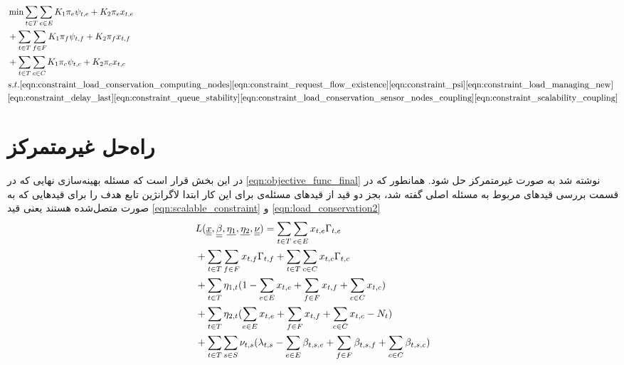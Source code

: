 	\begin{align}
		&\min \sum_{t \in T}\sum_{e \in E} 				K_1\pi_e\psi_{t,e}+K_2\pi_ex_{t,e}\notag \\
		&+\sum_{t \in T}\sum_{f \in F} 	K_1\pi_f\psi_{t,f}+K_2\pi_fx_{t,f}\notag \\
		&+\sum_{t \in T}\sum_{c \in C} K_1\pi_c\psi_{t,c}+K_2\pi_cx_{t,c} \label{eqn:objective_func_final} \notag \\
		&s.t. 
		\cref{eqn:constraint_load_conservation_computing_nodes}
		\cref{eqn:constraint_request_flow_existence}				\cref{eqn:constraint_psi}
		\cref{eqn:constraint_load_managing_new} \notag \\
		&\cref{eqn:constraint_delay_last}
		\cref{eqn:constraint_queue_stability}
		\cref{eqn:constraint_load_conservation_sensor_nodes_coupling}
		\cref{eqn:constraint_scalability_coupling}
	\end{align}
	
	\section{راه‌حل غیرمتمرکز}
	در این بخش قرار است که مسئله بهینه‌سازی نهایی که در \cref{eqn:objective_func_final} نوشته شد به صورت غیرمتمرکز حل شود. 
	همانطور که در قسمت بررسی قیدهای مربوط به مسئله اصلی گفته شد، بجز دو قید از قیدهای مسئله‌ی 
		 برای این کار ابتدا لاگرانژین تابع هدف را برای قیدهایی که به صورت متصل‌شده هستند یعنی قید \cref{eqn:scalable_constraint} و \cref{eqn:load_conservation2} 
	\begin{subequations}
		\begin{align}
		& \notag L(\underline{\underline x}, \underline{\underline \beta}, \underline {\eta_1}, \underline {\eta_2}, \underline{\underline \nu}) = \sum_{t \in T}\sum_{e \in E} x_{t,e}\Gamma_{t,e} \\
		& \notag + \sum_{t \in T}\sum_{f \in F} x_{t,f}\Gamma_{t,f} + \sum_{t \in T}\sum_{c \in C} x_{t,c}\Gamma_{t,c} \\
		& \notag + \sum_{t \in T  }{\eta_{1,t}(1-\sum_{e \in E}x_{t,e} + \sum_{f \in F}x_{t,f} + \sum_{c \in C}x_{t,c})} \\
		& \notag + \sum_{t \in T}{\eta_{2,t}(\sum_{e \in E}x_{t,e} + \sum_{f \in F}x_{t,f} + \sum_{c \in C}x_{t,c}-N_t)} \\
		& + \sum_{t \in T}\sum_{s \in S}{\nu_{t,s}(\lambda_{t,s} - \sum_{e \in E}\beta_{t,s,e} + \sum_{f \in F}\beta_{t,s,f} +\sum_{c \in C}\beta_{t,s,c})}
		\end{align}
	\end{subequations}
	

